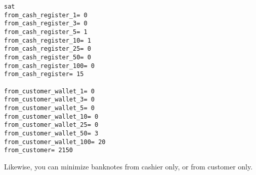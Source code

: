 \begin{lstlisting}
sat
from_cash_register_1= 0
from_cash_register_3= 0
from_cash_register_5= 1
from_cash_register_10= 1
from_cash_register_25= 0
from_cash_register_50= 0
from_cash_register_100= 0
from_cash_register= 15

from_customer_wallet_1= 0
from_customer_wallet_3= 0
from_customer_wallet_5= 0
from_customer_wallet_10= 0
from_customer_wallet_25= 0
from_customer_wallet_50= 3
from_customer_wallet_100= 20
from_customer= 2150
\end{lstlisting}

Likewise, you can minimize banknotes from cashier only, or from customer only.

